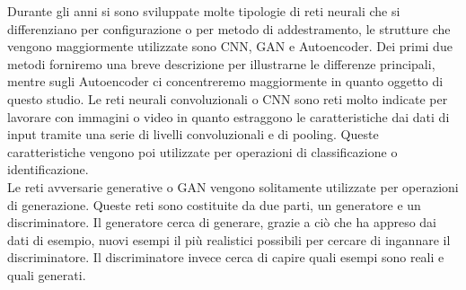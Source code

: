 Durante gli anni si sono sviluppate molte tipologie di reti neurali che si differenziano per configurazione o per metodo di addestramento, le strutture che vengono maggiormente utilizzate sono CNN, GAN e Autoencoder. Dei primi due metodi forniremo una breve descrizione per illustrarne le differenze principali, mentre sugli Autoencoder ci concentreremo maggiormente in quanto oggetto di questo studio.
Le reti neurali convoluzionali o CNN sono reti molto indicate per lavorare con immagini o video in quanto estraggono le caratteristiche dai dati di input tramite una serie di livelli convoluzionali e di pooling. Queste caratteristiche vengono poi utilizzate per operazioni di classificazione o identificazione.\\
Le reti avversarie generative o GAN vengono solitamente utilizzate per operazioni di generazione. Queste reti sono costituite da due parti, un generatore e un discriminatore. Il generatore cerca di generare, grazie a ciò che ha appreso dai dati di esempio, nuovi esempi il più realistici possibili per cercare di ingannare il discriminatore. Il discriminatore invece cerca di capire quali esempi sono reali e quali generati. 


